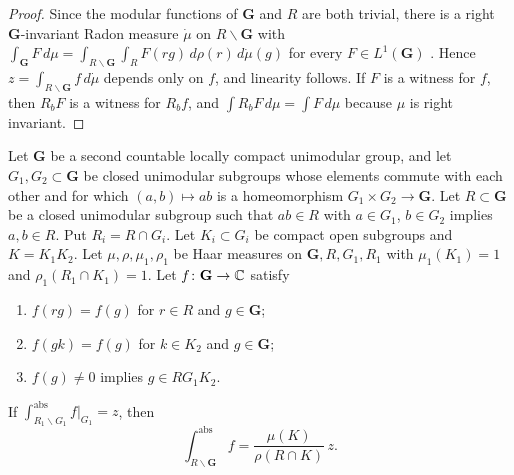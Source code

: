 \begin{proof}
Since the modular functions of $\mathbf G$ and $R$ are both trivial, there is a right $\mathbf G$-invariant Radon measure $\dot\mu$ on $R\backslash\mathbf G$ with $\int_{\mathbf G}F\,d\mu=\int_{R\backslash\mathbf G}\int_RF(rg)\,d\rho(r)\,d\dot\mu(g)$ for every $F\in L^1(\mathbf G)$ \cite[\S2.6]{w2folland}. Hence $z=\int_{R\backslash\mathbf G}f\,d\dot\mu$ depends only on $f$, and linearity follows. If $F$ is a witness for $f$, then $R_bF$ is a witness for $R_bf$, and $\int R_bF\,d\mu=\int F\,d\mu$ because $\mu$ is right invariant.
\end{proof}

\begin{lemma}\label{w3s:lem:collapse}
Let $\mathbf G$ be a second countable locally compact unimodular group, and let $G_1,G_2\subset\mathbf G$ be closed unimodular subgroups whose elements commute with each other and for which $(a,b)\mapsto ab$ is a homeomorphism $G_1\times G_2\to\mathbf G$. Let $R\subset\mathbf G$ be a closed unimodular subgroup such that $ab\in R$ with $a\in G_1$, $b\in G_2$ implies $a,b\in R$. Put $R_i=R\cap G_i$. Let $K_i\subset G_i$ be compact open subgroups and $K=K_1K_2$. Let $\mu,\rho,\mu_1,\rho_1$ be Haar measures on $\mathbf G,R,G_1,R_1$ with $\mu_1(K_1)=1$ and $\rho_1(R_1\cap K_1)=1$. Let $f\colon\mathbf G\to\mathbb C$ satisfy
\begin{enumerate}[label=(\roman*),leftmargin=*]
\item $f(rg)=f(g)$ for $r\in R$ and $g\in\mathbf G$;
\item $f(gk)=f(g)$ for $k\in K_2$ and $g\in\mathbf G$;
\item $f(g)\ne0$ implies $g\in RG_1K_2$.
\end{enumerate}
If $\int^{\mathrm{abs}}_{R_1\backslash G_1}f|_{G_1}=z$, then
\[
\int^{\mathrm{abs}}_{R\backslash\mathbf G}f=\frac{\mu(K)}{\rho(R\cap K)}\,z .
\]
\end{lemma}

